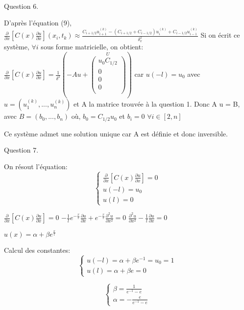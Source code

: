 \documentclass[a4paper,11pt]{article}
\theoremstyle{nonumberplain}
\begin{document}
Question 6.

D'après l'équation (9),
\newline
$ \frac{\partial }{\partial x} [C(x)\frac{\partial u }{\partial x}](x_i, t_k) \approx \frac{C_{i+1/2}u_{i+1}^{(k)} - (C_{i+1/2} + C_{i-1/2})u_i^{(k)} + C_{i-1/2}u_{i-1}^{(k)}}{\delta_x^2} $
\newline
Si on écrit ce système, $\forall i $ sous forme matricielle, on obtient:
\newline
$ \frac{\partial }{\partial x} [C(x)\frac{\partial u }{\partial x}] = \frac{1}{\delta ^2} (-A u +
\overset{U} {
    \begin{pmatrix}
        u_0 C_{1/2} \\
        0 \\
        0 \\
        0 \\
    \end{pmatrix}
})$
car $u(-l) = u_0$
avec $u = (u_1^{(k)}, ... , u_n^{(k)}) $
et A la matrice trouvée à la question 1.
\newline
Donc A u = B, avec $B = (b_0, ..., b_n)$
où, $b_0 = C_{1/2} u_0$
et $b_i = 0$  $\forall i \in [2, n] $
\newline

Ce système admet une solution unique car A est définie et donc inversible.
\newline

Question 7.

On résout l'équation:
$$\left\{
\begin{array}{ll}
  \frac{\partial}{\partial x}[C(x)\frac{\partial u}{\partial x}] = 0 \\
  u(-l) = u_0 \\
  u(l) = 0
  \end{array}
\right.
$$

$  \frac{\partial}{\partial x}[C(x)\frac{\partial u}{\partial x}] = 0 $
$  -\frac{1}{l} e^{-\frac{x}{l}}\frac{\partial u}{\partial x} + e^{-\frac{x}{l}} \frac{\partial^2 u }{\partial x^2} = 0 $
$ \frac{\partial^2 u}{\partial x^2} - \frac{1}{l} \frac{\partial u}{\partial x} = 0$

$u(x) = \alpha + \beta e^{\frac{x}{l}} $

Calcul des constantes:
$$\left\{
  \begin{array}{ll}
    u(-l) = \alpha + \beta e^{-1} = u_0 = 1 \\
    u(l) = \alpha + \beta e = 0
  \end{array}
\right.
$$

$$\left\{
  \begin{array}{ll}
    \beta = \frac{1}{e^{-1} - e} \\
    \alpha = -\frac{e}{e^{-1} - e}
  \end{array}
\right.
$$
\end{document}
